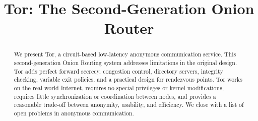 \documentclass[times,10pt,twocolumn]{article}
\begin{document}

\title{Tor: The Second-Generation Onion Router}


\maketitle
\thispagestyle{empty}

\begin{abstract}
We present Tor, a circuit-based low-latency anonymous communication
service. This second-generation Onion Routing system addresses limitations
in the original design. Tor adds perfect forward secrecy, congestion
control, directory servers, integrity checking, variable exit policies,
and a practical design for rendezvous points. Tor works on the real-world
Internet, requires no special privileges or kernel modifications, requires
little synchronization or coordination between nodes, and provides a
reasonable trade-off between anonymity, usability, and efficiency. We
close with a list of open problems in anonymous communication.
\end{abstract}



\label{sec:intro}
\end{document}

